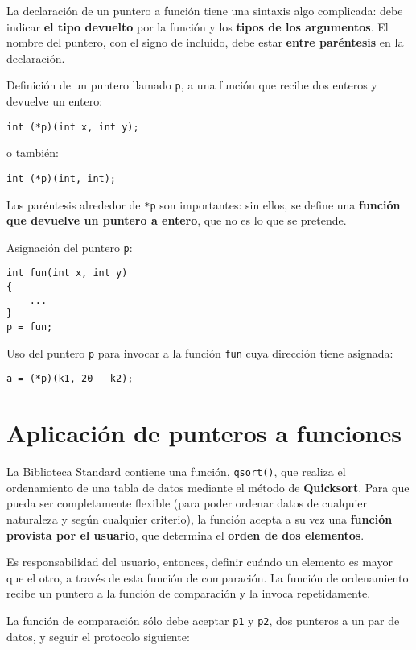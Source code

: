 La declaración de un puntero a función tiene una sintaxis algo complicada: debe
indicar \textbf{el tipo devuelto} por la función y los \textbf{tipos de los argumentos}. El nombre del puntero, con el signo de  incluido, debe estar \textbf{entre paréntesis} en la declaración.

\begin{ejemplo}
Definición de un puntero llamado \lstinline{p}, a una función que recibe dos enteros y devuelve un entero:
\begin{lstlisting}
int (*p)(int x, int y);
\end{lstlisting}

o también:
\begin{lstlisting}
int (*p)(int, int);
\end{lstlisting}

Los paréntesis alrededor de \lstinline{*p} son importantes: sin ellos, se define una
\textbf{función que devuelve un puntero a entero}, que no es lo que se pretende.

Asignación del puntero \lstinline{p}:
\begin{lstlisting}
int fun(int x, int y)
{
    ...
}
p = fun;
\end{lstlisting}
Uso del puntero \lstinline{p} para invocar a la función \lstinline{fun} cuya dirección tiene asignada:
\begin{lstlisting}
a = (*p)(k1, 20 - k2);
\end{lstlisting}
\end{ejemplo}

\section{Aplicación de punteros a funciones}
La Biblioteca Standard contiene una función, \lstinline{qsort()}, que realiza el ordenamiento de una
tabla de datos mediante el método de \textbf{Quicksort}. Para que pueda ser
completamente flexible (para poder ordenar datos de cualquier naturaleza y según cualquier criterio), la
función acepta a su vez una \textbf{función provista por el usuario}, que determina el
\textbf{orden de dos elementos}. 

Es responsabilidad del usuario, entonces, definir
cuándo un elemento es mayor que el otro, a través de esta función de
comparación. La función de ordenamiento recibe un puntero a la función de comparación y la
invoca repetidamente.


La función de comparación sólo debe aceptar \lstinline{p1} y \lstinline{p2}, dos punteros a un par de
datos, y seguir el protocolo siguiente:


